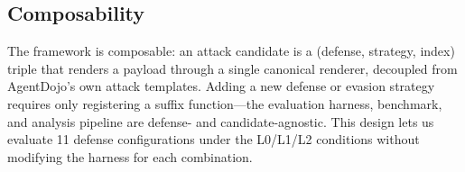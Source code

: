 \subsection{Composability}

The framework is composable: an attack candidate is a (defense, strategy, index) triple that renders a payload through a single canonical renderer, decoupled from AgentDojo's own attack templates. Adding a new defense or evasion strategy requires only registering a suffix function---the evaluation harness, benchmark, and analysis pipeline are defense- and candidate-agnostic. This design lets us evaluate 11 defense configurations under the L0/L1/L2 conditions without modifying the harness for each combination.
